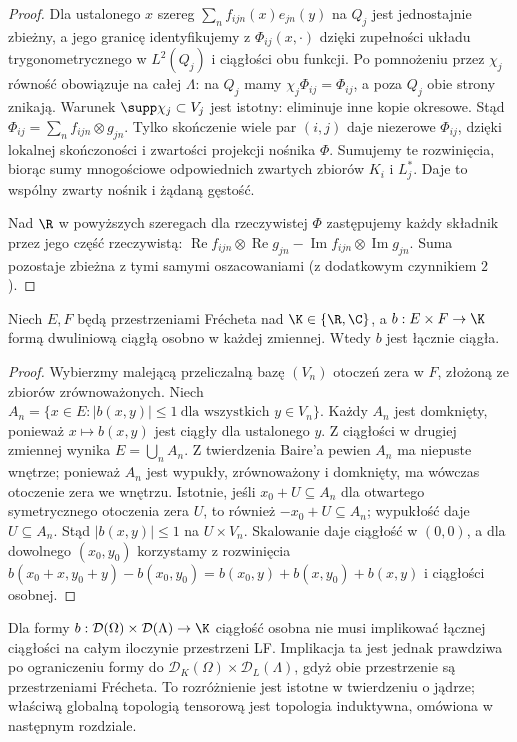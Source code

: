 \begin{proof}
Dla ustalonego $x$ szereg $\sum_n f_{ijn}(x)e_{jn}(y)$
na $Q_j$ jest jednostajnie zbieżny, a jego granicę
identyfikujemy z $\Phi_{ij}(x,\cdot)$ dzięki
zupełności układu trygonometrycznego w $L^2(Q_j)$
i ciągłości obu funkcji. Po pomnożeniu przez $\chi_j$
równość obowiązuje na całej $\Lambda$: na $Q_j$
mamy $\chi_j\Phi_{ij}=\Phi_{ij}$, a poza $Q_j$
obie strony znikają. Warunek $\supp\chi_j\subset V_j$
jest istotny: eliminuje inne kopie okresowe.
Stąd $\Phi_{ij}=\sum_n f_{ijn}\otimes g_{jn}$.
Tylko skończenie wiele par $(i,j)$ daje niezerowe
$\Phi_{ij}$, dzięki lokalnej skończoności i zwartości
projekcji nośnika $\Phi$. Sumujemy te rozwinięcia,
biorąc sumy mnogościowe odpowiednich zwartych zbiorów
$K_i$ i $L_j^*$. Daje to wspólny zwarty nośnik
i żądaną gęstość.

Nad $\R$ w powyższych szeregach dla rzeczywistej $\Phi$
zastępujemy każdy składnik przez jego część rzeczywistą:
$\operatorname{Re}f_{ijn}\otimes\operatorname{Re}g_{jn}
-\operatorname{Im}f_{ijn}\otimes\operatorname{Im}g_{jn}$.
Suma pozostaje zbieżna z tymi samymi oszacowaniami
(z dodatkowym czynnikiem $2$).
\end{proof}

\begin{lemat}
\label{lem:separate-joint23}
Niech $E,F$ będą przestrzeniami Frécheta nad
$\K\in\{\R,\C\}$, a $b:E\times F\to\K$
formą dwuliniową ciągłą osobno w każdej zmiennej.
Wtedy $b$ jest łącznie ciągła.
\end{lemat}
\begin{proof}
Wybierzmy malejącą przeliczalną bazę
$(V_n)$ otoczeń zera w $F$, złożoną ze zbiorów
zrównoważonych. Niech
$A_n=\{x\in E: |b(x,y)|\le1\ \text{dla wszystkich }y\in V_n\}$.
Każdy $A_n$ jest domknięty, ponieważ $x\mapsto b(x,y)$
jest ciągły dla ustalonego $y$. Z ciągłości w drugiej
zmiennej wynika $E=\bigcup_n A_n$.
Z twierdzenia Baire'a pewien $A_n$ ma niepuste wnętrze;
ponieważ $A_n$ jest wypukły, zrównoważony i domknięty,
ma wówczas otoczenie zera we wnętrzu. Istotnie,
jeśli $x_0+U\subseteq A_n$ dla otwartego symetrycznego
otoczenia zera $U$, to również $-x_0+U\subseteq A_n$;
wypukłość daje $U\subseteq A_n$.
Stąd $|b(x,y)|\le1$ na $U\times V_n$.
Skalowanie daje ciągłość w $(0,0)$, a dla
dowolnego $(x_0,y_0)$ korzystamy z rozwinięcia
$b(x_0+x,y_0+y)-b(x_0,y_0)
=b(x_0,y)+b(x,y_0)+b(x,y)$ i ciągłości osobnej.
\end{proof}

\begin{uwaga}
\label{rem:kernel-separate23}
Dla formy $b:\mathcal D(\Omega)\times\mathcal D(\Lambda)\to\K$
ciągłość osobna nie musi implikować łącznej ciągłości na
całym iloczynie przestrzeni LF. Implikacja ta jest jednak
prawdziwa po ograniczeniu formy do
$\mathcal D_K(\Omega)\times\mathcal D_L(\Lambda)$,
gdyż obie przestrzenie są przestrzeniami Frécheta.
To rozróżnienie jest istotne w twierdzeniu o jądrze;
właściwą globalną topologią tensorową jest topologia
induktywna, omówiona w następnym rozdziale.
\end{uwaga}

